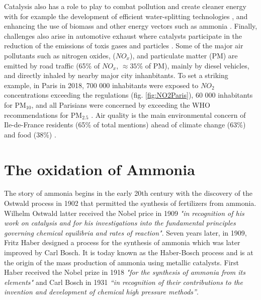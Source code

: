 Catalysis also has a role to play to combat pollution and create cleaner energy with for example the development of efficient water-splitting technologies \parencite{AHMAD2015599}, and enhancing the use of biomass and other energy vectors such as ammonia \parencite{Fang2022}.
Finally, challenges also arise in automotive exhaust where catalysts participate in the reduction of the emissions of toxis gases and particles \parencite{WHOAirPollution, GANDHI2003433}.
Some of the major air pollutants such as nitrogen oxides, ($NO_x$), and particulate matter (PM) are emitted by road traffic (65\% of $NO_x$, $\approx 35\%$ of PM), mainly by diesel vehicles, and directly inhaled by nearby major city inhanbitants.
To set a striking example, in Paris in 2018, 700 000 inhabitants were exposed to $NO_2$ concentrations exceeding the regulations (fig. \ref{fig:NO2Paris}), 60 000 inhabitants for PM$_{10}$, and all Parisians were concerned by exceeding the WHO recommendations for PM$_{2.5}$ \parencite{AirParis}.
Air quality is the main environmental concern of Ile-de-France residents (65\% of total mentions) ahead of climate change (63\%) and food (38\%) \parencite{AirParis}.

\section{The oxidation of Ammonia}

The story of ammonia begins in the early 20th century \parencite{Alexander1920,CHEN201931} with the discovery of the Ostwald process in 1902 that permitted the synthesis of fertilizers from ammonia.
Wilhelm Ostwald latter received the Nobel price in 1909 \textit{"in recognition of his work on catalysis and for his investigations into the fundamental principles governing chemical equilibria and rates of reaction"}.
Seven years later, in 1909, Fritz Haber designed a process for the synthesis of ammonia which was later improved by Carl Bosch.
It is today known as the Haber-Bosch process and is at the origin of the mass production of ammonia using metallic catalysts.
First Haber received the Nobel prize in 1918 \textit{"for the synthesis of ammonia from its elements"} and Carl Bosch in 1931 \textit{“in recognition of their contributions to the invention and development of chemical high pressure methods”}.

